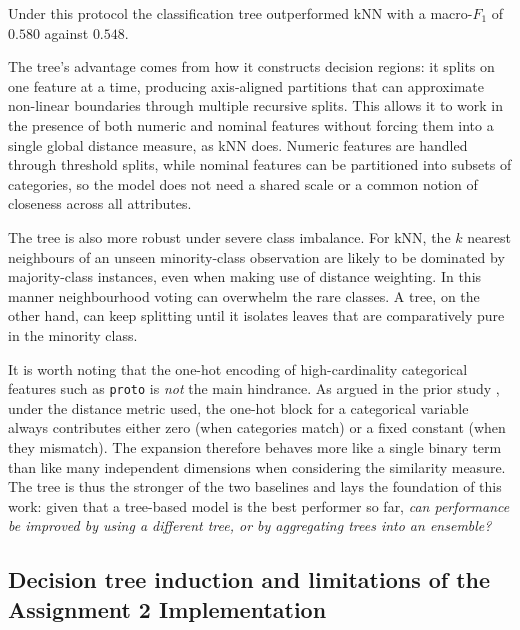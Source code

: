 \documentclass[conference]{IEEEtran}
\begin{document}
Under this protocol the classification tree outperformed kNN with a macro-$F_1$ of
$0.580$ against $0.548$. 

The tree’s advantage comes from how it constructs decision regions: it splits on one
feature at a time, producing axis-aligned partitions that can approximate non-linear 
boundaries through multiple recursive splits. This allows it to work in the presence of both
numeric and nominal features without forcing them into a single global distance measure, 
as kNN does. Numeric features are handled through threshold splits, while nominal 
features can be partitioned into subsets of categories, so the model does not need a 
shared scale or a common notion of closeness across all attributes.

The tree is also more robust under severe class imbalance. For kNN, the \(k\) nearest 
neighbours of an unseen minority-class observation are likely to be dominated by
majority-class instances, even when making use of distance weighting. In this 
manner neighbourhood voting can overwhelm the rare classes.
A tree, on the other hand, can keep splitting until it isolates leaves that 
are comparatively pure in the minority class.

It is worth noting that the one-hot encoding of high-cardinality categorical features such as 
\texttt{proto} is \emph{not} the main hindrance. As argued in the prior study \cite{a2}, 
under the distance metric used, the one-hot block for a categorical variable always contributes 
either zero (when categories match) or a fixed constant (when they mismatch). The expansion 
therefore behaves more like a single binary term than like many independent 
dimensions when considering the similarity measure. The tree is thus the stronger of the two 
baselines and lays the foundation of this work: given that a tree-based model is the best performer so far, 
\emph{can performance be improved by using a different tree, or by aggregating trees into 
an ensemble?}

\subsection{Decision tree induction and limitations of the Assignment 2 Implementation} %
\end{document}
